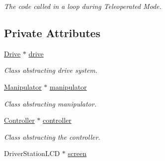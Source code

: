 \begin{DoxyCompactItemize}
\begin{DoxyCompactList}\small\item\em The code called in a loop during Teleoperated Mode. \item\end{DoxyCompactList}\end{DoxyCompactItemize}
\subsection*{Private Attributes}
\begin{DoxyCompactItemize}
\item 
\hypertarget{class_builtin_default_code_a2d4ed2369361dcd5b02e74dac9b3f4dd}{
\hyperlink{class_r_j_f_r_c2011_1_1_drive}{Drive} $\ast$ \hyperlink{class_builtin_default_code_a2d4ed2369361dcd5b02e74dac9b3f4dd}{drive}}
\label{class_builtin_default_code_a2d4ed2369361dcd5b02e74dac9b3f4dd}

\begin{DoxyCompactList}\small\item\em Class abstracting drive system. \item\end{DoxyCompactList}\item 
\hypertarget{class_builtin_default_code_ac2ed56fdb661e5c24cd9b012f9d09b63}{
\hyperlink{class_r_j_f_r_c2011_1_1_manipulator}{Manipulator} $\ast$ \hyperlink{class_builtin_default_code_ac2ed56fdb661e5c24cd9b012f9d09b63}{manipulator}}
\label{class_builtin_default_code_ac2ed56fdb661e5c24cd9b012f9d09b63}

\begin{DoxyCompactList}\small\item\em Class abstracting manipulator. \item\end{DoxyCompactList}\item 
\hypertarget{class_builtin_default_code_af8e1d3aaa175d9d8091438a00b4b1556}{
\hyperlink{class_r_j_f_r_c2011_1_1_controller}{Controller} $\ast$ \hyperlink{class_builtin_default_code_af8e1d3aaa175d9d8091438a00b4b1556}{controller}}
\label{class_builtin_default_code_af8e1d3aaa175d9d8091438a00b4b1556}

\begin{DoxyCompactList}\small\item\em Class abstracting the controller. \item\end{DoxyCompactList}\item 
\hypertarget{class_builtin_default_code_ac09bfa871751a5c092c1db9cb3ad37e9}{
DriverStationLCD $\ast$ \hyperlink{class_builtin_default_code_ac09bfa871751a5c092c1db9cb3ad37e9}{screen}}
\label{class_builtin_default_code_ac09bfa871751a5c092c1db9cb3ad37e9}


\end{DoxyCompactItemize}
